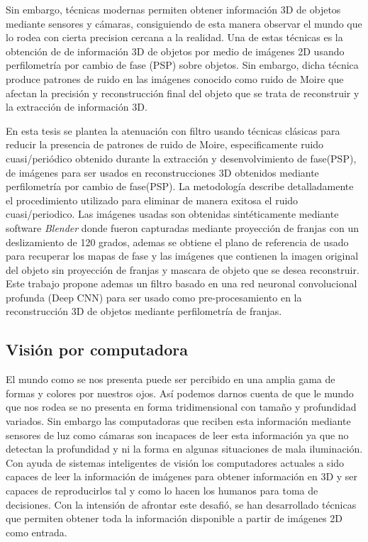 \documentclass[10pt,letterpaper]{article}
\begin{document}
Sin embargo, técnicas modernas permiten obtener información 3D de objetos mediante sensores y cámaras, consiguiendo de esta manera observar el mundo que lo rodea con cierta precision cercana a la realidad. Una de estas técnicas es la obtención de de información 3D de objetos por medio de imágenes 2D usando perfilometría por cambio de fase (PSP) sobre objetos. Sin embargo, dicha técnica produce patrones de ruido en las imágenes conocido como ruido de Moire que afectan la precisión y reconstrucción final del objeto que se trata de reconstruir y la extracción de información 3D.

En esta tesis se plantea la atenuación con filtro usando técnicas clásicas para reducir la presencia de patrones de ruido de Moire, especificamente ruido cuasi/periódico obtenido durante la extracción y desenvolvimiento de fase(PSP), de imágenes para ser usados en reconstrucciones 3D obtenidos mediante perfilometría por cambio de fase(PSP). La metodología describe detalladamente el procedimiento utilizado para eliminar de manera exitosa el ruido cuasi/periodico. Las imágenes usadas son obtenidas sintéticamente mediante software \textit{Blender} donde fueron capturadas mediante proyección de franjas con un deslizamiento de 120 grados, ademas se obtiene el plano de referencia de usado para recuperar los mapas de fase y las imágenes que contienen la imagen original del objeto sin proyección de franjas y mascara de objeto que se desea reconstruir. Este trabajo propone ademas un filtro basado en una red neuronal convolucional profunda (Deep CNN) para ser usado como pre-procesamiento en la reconstrucción 3D de objetos mediante perfilometría de franjas.

\subsection{Visión por computadora}
El mundo como se nos presenta puede ser percibido en una amplia gama de formas y colores por nuestros ojos. Así podemos darnos cuenta de que le mundo que nos rodea se no presenta en forma tridimensional con tamaño y profundidad variados. Sin embargo las computadoras que reciben esta información mediante sensores de luz como cámaras son incapaces de leer esta información ya que no detectan la profundidad y ni la forma en algunas situaciones de mala iluminación. Con ayuda de sistemas inteligentes de visión los computadores actuales a sido capaces de leer la información de imágenes para obtener información en 3D y ser capaces de reproducirlos tal y como lo hacen los humanos para toma de decisiones. Con la intensión de afrontar este desafió, se han desarrollado técnicas que permiten obtener toda la información disponible a partir de imágenes 2D como entrada.
\end{document}
